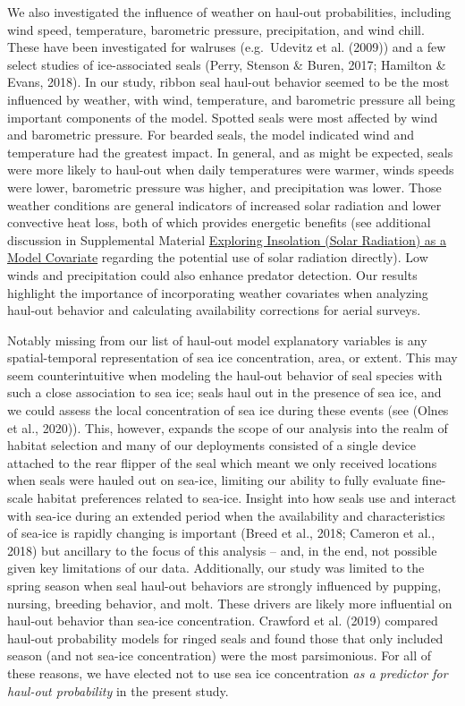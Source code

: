 \documentclass[fleqn,10pt,lineno]{wlpeerj} %
\begin{document}
We also investigated the influence of weather on haul-out probabilities,
including wind speed, temperature, barometric pressure, precipitation, and wind
chill. These have been investigated for walruses (e.g.~Udevitz et al.
(2009)) and a few select studies of ice-associated seals
(Perry, Stenson \& Buren, 2017; Hamilton \& Evans, 2018). In our study, ribbon seal haul-out behavior seemed to be the most
influenced by weather, with wind, temperature, and barometric pressure all being
important components of the model. Spotted seals were most affected by wind and
barometric pressure. For bearded seals, the model indicated wind and temperature
had the greatest impact. In general, and as might be expected, seals were more
likely to haul-out when daily temperatures were warmer, winds speeds were lower,
barometric pressure was higher, and precipitation was lower. Those weather
conditions are general indicators of increased solar radiation and lower
convective heat loss, both of which provides energetic benefits (see additional
discussion in Supplemental Material \protect\hyperlink{exploring-insolation-solar-radiation-as-a-model-covariate}{Exploring Insolation (Solar Radiation) as a
Model Covariate} regarding the potential use of solar radiation directly). Low
winds and precipitation could also enhance predator detection. Our results
highlight the importance of incorporating weather covariates when analyzing
haul-out behavior and calculating availability corrections for aerial surveys.

Notably missing from our list of haul-out model explanatory variables is any
spatial-temporal representation of sea ice concentration, area, or extent. This
may seem counterintuitive when modeling the haul-out behavior of seal species
with such a close association to sea ice; seals haul out in the presence of sea
ice, and we could assess the local concentration of sea ice during these events
(see (Olnes et al., 2020)). This, however, expands the scope of our analysis into the
realm of habitat selection and many of our deployments consisted of a single
device attached to the rear flipper of the seal which meant we only received
locations when seals were hauled out on sea-ice, limiting our ability to fully
evaluate fine-scale habitat preferences related to sea-ice. Insight into how
seals use and interact with sea-ice during an extended period when the
availability and characteristics of sea-ice is rapidly changing is important
(Breed et al., 2018; Cameron et al., 2018) but ancillary to the focus of this analysis -- and,
in the end, not possible given key limitations of our data. Additionally, our
study was limited to the spring season when seal haul-out behaviors are strongly
influenced by pupping, nursing, breeding behavior, and molt. These drivers are
likely more influential on haul-out behavior than sea-ice concentration.
Crawford et al. (2019) compared haul-out probability models for ringed
seals and found those that only included season (and not sea-ice concentration)
were the most parsimonious. For all of these reasons, we have elected not to use
sea ice concentration \emph{as a predictor for haul-out probability} in the present
study.
\end{document}
